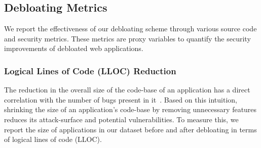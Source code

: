{%


\subsection{Debloating Metrics}
We report the effectiveness of our debloating scheme through various source code and security metrics. 
These metrics are proxy variables to quantify the security improvements of debloated web applications. 

\subsubsection*{Logical Lines of Code (LLOC) Reduction} 
The reduction in the overall size of the code-base of an application has a direct correlation with the number of bugs present in it~\cite{mcconnell2004code}. 
Based on this intuition, shrinking the size of an application's code-base by removing unnecessary features reduces its attack-surface and potential vulnerabilities. 
To measure this, we report the size of applications in our dataset before and after debloating in terms of logical lines of code (LLOC). 

}
